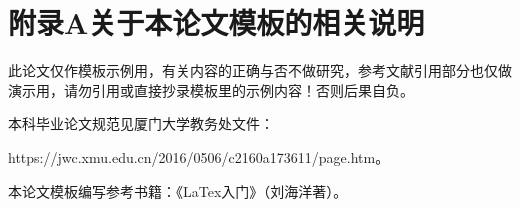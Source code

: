 \chapter{附录\space A\quad 关于本论文模板的相关说明}

此论文仅作模板示例用，有关内容的正确与否不做研究，参考文献引用部分也仅做演示用，请勿引用或直接抄录模板里的示例内容！否则后果自负。\par
本科毕业论文规范见厦门大学教务处文件：\par https://jwc.xmu.edu.cn/2016/0506/c2160a173611/page.htm。\par
本论文模板编写参考书籍：《LaTex入门》（刘海洋著）。\par